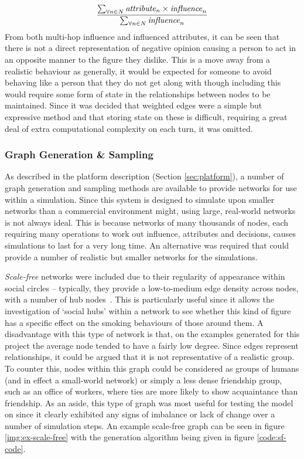\documentclass[]{report}
\begin{document}
\begin{equation}
\frac{\sum_{\forall n \in N} \text{\emph{attribute}}_{n} \times \text{\emph{influence}}_{n}}{\sum_{\forall n \in N}\text{\emph{influence}}_{n}}
\label{eq:inf-attr}
\end{equation}
From both multi-hop influence and influenced attributes, it can be seen that there is not a direct representation of negative opinion causing a person to act in an opposite manner to the figure they dislike. This is a move away from a realistic behaviour as generally, it would be expected for someone to avoid behaving like a person that they do not get along with though including this would require some form of state in the relationships between nodes to be maintained. Since it was decided that weighted edges were a simple but expressive method and that storing state on these is difficult, requiring a great deal of extra computational complexity on each turn, it was omitted.

\subsubsection{Graph Generation \& Sampling}
\label{sec:GGS}
As described in the platform description (Section \ref{sec:platform}), a number of graph generation and sampling methods are available to provide networks for use within a simulation. Since this system is designed to simulate upon smaller networks than a commercial environment might, using large, real-world networks is not always ideal. This is because networks of many thousands of nodes, each requiring many operations to work out influence, attributes and decisions, causes simulations to last for a very long time. An alternative was required that could provide a number of realistic but smaller networks for the simulations.

\emph{Scale-free} networks were included due to their regularity of appearance within social circles – typically, they provide a low-to-medium edge density across nodes, with a number of hub nodes~\cite{BA-SciAm}. This is particularly useful since it allows the investigation of `social hubs' within a network to see whether this kind of figure has a specific effect on the smoking behaviours of those around them. A disadvantage with this type of network is that, on the examples generated for this project the average node tended to have a fairly low degree. Since edges represent relationships, it could be argued that it is not representative of a realistic group. To counter this, nodes within this graph could be considered as groups of humans (and in effect a small-world network) or simply a less dense friendship group, such as an office of workers, where ties are more likely to show acquaintance than friendship. As an aside, this type of graph was most useful for testing the model on since it clearly exhibited any signs of imbalance or lack of change over a number of simulation steps. An example scale-free graph can be seen in figure \ref{img:ex-scale-free} with the generation algorithm being given in figure \ref{code:sf-code}.
\end{document}
